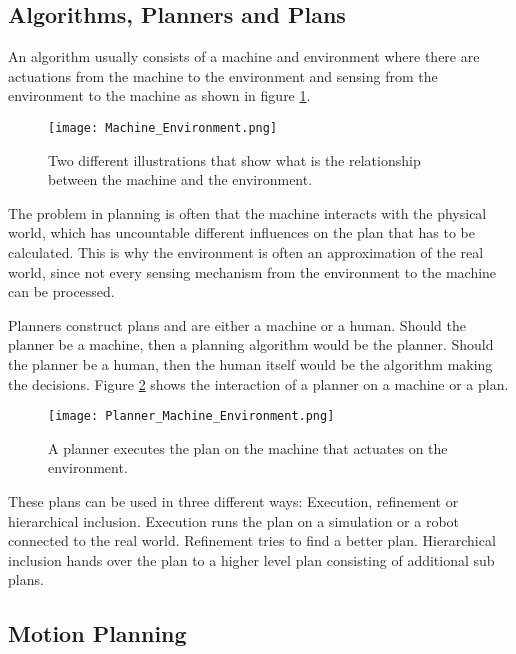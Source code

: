 \subsection{Algorithms, Planners and Plans} \label{sec:Algorithms, Planners and Plans}
An algorithm usually consists of a machine and environment where there are actuations from the machine to the environment and sensing from the environment to the machine as shown in figure \ref{fig:Machine and Environment interaction}.
\begin{figure}[H]
    \centering
    \texttt{[image: Machine\_Environment.png]}
    \caption{Two different illustrations that show what is the relationship between the machine and the environment. \cite{planning_algorithms_steven_m_lavalle}}
    \label{fig:Machine and Environment interaction}
\end{figure}
The problem in planning is often that the machine interacts with the physical world, which has uncountable different influences on the plan that has to be calculated. This is why the environment is often an approximation of the real world, since not every sensing mechanism from the environment to the machine can be processed.

Planners construct plans and are either a machine or a human. Should the planner be a machine, then a planning algorithm would be the planner. Should the planner be a human, then the human itself would be the algorithm making the decisions. Figure \ref{fig:Planner Machine Environment} shows the interaction of a planner on a machine or a plan.
\begin{figure}[H]
    \centering
    \texttt{[image: Planner\_Machine\_Environment.png]}
    \caption{A planner executes the plan on the machine that actuates on the environment. \cite{planning_algorithms_steven_m_lavalle}}
    \label{fig:Planner Machine Environment}
\end{figure}

These plans can be used in three different ways: Execution, refinement or hierarchical inclusion. Execution runs the plan on a simulation or a robot connected to the real world. Refinement tries to find a better plan. Hierarchical inclusion hands over the plan to a higher level plan consisting of additional sub plans. \cite{planning_algorithms_steven_m_lavalle}

\subsection{Motion Planning} \label{sec:Motion Planning}

